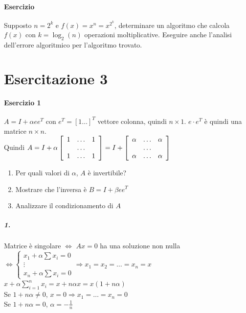 \documentclass[10pt]{book}
\begin{document}
\paragraph{Esercizio} Supposto $n = 2^k$ e $f(x) = x^n = x^{2^k}$, determinare un algoritmo che calcola $f(x)$ con $k = \log_2(n)$ operazioni moltiplicative. Eseguire anche l'analisi dell'errore algoritmico per l'algoritmo trovato.
\pagebreak
\section{Esercitazione 3}
\paragraph{Esercizio 1}
$A = I + \alpha e e^T$ con $e^T = [1\ldots ]^T$ vettore colonna, quindi $n \times 1$. $e\cdot e^T$ è quindi una matrice $n \times n$.\\
Quindi $A = I + \alpha\left[
\begin{array}{c c c}
	1 & \ldots & 1\\
	 & \ldots\\
	1 & \ldots & 1
\end{array}
\right]
= I + \left[
\begin{array}{c c c}
	\alpha & \ldots & \alpha\\
	 & \ldots\\
	\alpha & \ldots & \alpha
\end{array}
\right]
$
\begin{enumerate}
	\item Per quali valori di $\alpha$, $A$ è invertibile?
	\item Mostrare che l'inversa è $B = I + \beta e e^T$
	\item Analizzare il condizionamento di $A$
\end{enumerate}
\subparagraph{1.} Matrice è singolare $\Leftrightarrow$ $Ax = 0$ ha una soluzione non nulla $\Leftrightarrow \left\{ \begin{array}{l }
	x_1 + \alpha \sum x_i = 0\\
	\vdots\\
	x_n + \alpha \sum x_i = 0
\end{array}
\right.
\Rightarrow x_1 = x_2 = \ldots = x_n = x
$\\
$x + \alpha \sum _{i = 1}^n x_i = x + n \alpha x = x (1 + n\alpha)$\\
Se $1 + n\alpha \neq 0$, $x = 0 \Rightarrow x_1 = \ldots = x_n = 0$\\
Se $1 + n\alpha = 0$, $\alpha = -\frac{1}{n}$\\
\end{document}
